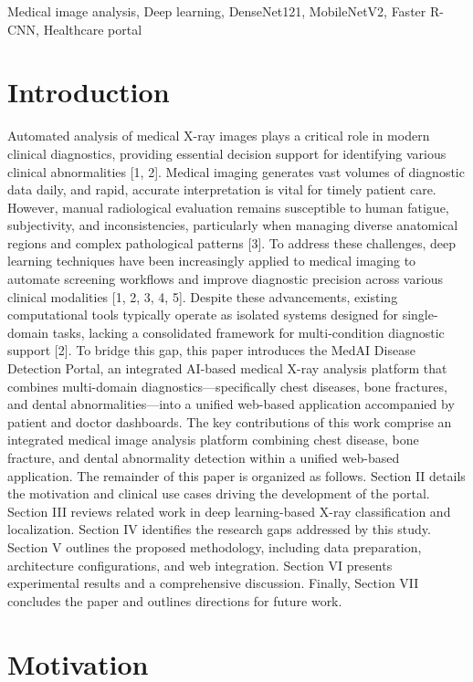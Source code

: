 \documentclass[conference]{IEEEtran}
\begin{document}
\begin{IEEEkeywords}
Medical image analysis, Deep learning, DenseNet121, MobileNetV2, Faster R-CNN, Healthcare portal
\end{IEEEkeywords}

\section{Introduction}

Automated analysis of medical X-ray images plays a critical role in modern clinical diagnostics, providing essential decision support for identifying various clinical abnormalities [1, 2]. Medical imaging generates vast volumes of diagnostic data daily, and rapid, accurate interpretation is vital for timely patient care. However, manual radiological evaluation remains susceptible to human fatigue, subjectivity, and inconsistencies, particularly when managing diverse anatomical regions and complex pathological patterns [3]. To address these challenges, deep learning techniques have been increasingly applied to medical imaging to automate screening workflows and improve diagnostic precision across various clinical modalities [1, 2, 3, 4, 5]. Despite these advancements, existing computational tools typically operate as isolated systems designed for single-domain tasks, lacking a consolidated framework for multi-condition diagnostic support [2]. To bridge this gap, this paper introduces the MedAI Disease Detection Portal, an integrated AI-based medical X-ray analysis platform that combines multi-domain diagnostics—specifically chest diseases, bone fractures, and dental abnormalities—into a unified web-based application accompanied by patient and doctor dashboards. The key contributions of this work comprise an integrated medical image analysis platform combining chest disease, bone fracture, and dental abnormality detection within a unified web-based application. The remainder of this paper is organized as follows. Section II details the motivation and clinical use cases driving the development of the portal. Section III reviews related work in deep learning-based X-ray classification and localization. Section IV identifies the research gaps addressed by this study. Section V outlines the proposed methodology, including data preparation, architecture configurations, and web integration. Section VI presents experimental results and a comprehensive discussion. Finally, Section VII concludes the paper and outlines directions for future work.

\section{Motivation}
\end{document}
